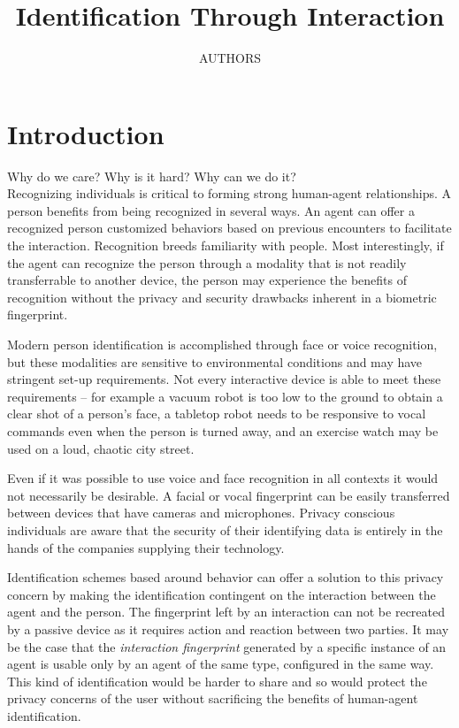 \documentclass[conference]{IEEEtran}
\title{Identification Through Interaction}
\author{AUTHORS \meta{TODO: LIST AUTHORS}} %
\date{\vspace{-1em}}
\begin{document}
\maketitle


\section{Introduction}
Why do we care? Why is it hard? Why can we do it?\\

Recognizing individuals is critical to forming strong human-agent relationships. A person benefits from being recognized in several ways. An agent can offer a recognized person customized behaviors based on previous encounters to facilitate the interaction. Recognition breeds familiarity with people. Most interestingly, if the agent can recognize the person through a modality that is not readily transferrable to another device, the person may experience the benefits of recognition without the privacy and security drawbacks inherent in a biometric fingerprint. 

Modern person identification is accomplished through face or voice recognition, but these modalities are sensitive to environmental conditions and may have stringent set-up requirements. Not every interactive device is able to meet these requirements -- for example a vacuum robot is too low to the ground to obtain a clear shot of a person's face, a tabletop robot needs to be responsive to vocal commands even when the person is turned away, and an exercise watch may be used on a loud, chaotic city street. 

Even if it was possible to use voice and face recognition in all contexts it would not necessarily be desirable. A facial or vocal fingerprint can be easily transferred between devices that have cameras and microphones. Privacy conscious individuals are aware that the security of their identifying data is entirely in the hands of the companies supplying their technology. 

Identification schemes based around behavior can offer a solution to this privacy concern by making the identification contingent on the interaction between the agent and the person. The fingerprint left by an interaction can not be recreated by a passive device as it requires action and reaction between two parties. It may be the case that the \textit{interaction fingerprint} generated by a specific instance of an agent is usable only by an agent of the same type, configured in the same way. This kind of identification would be harder to share and so would protect the privacy concerns of the user without sacrificing the benefits of human-agent identification. 
\end{document}
